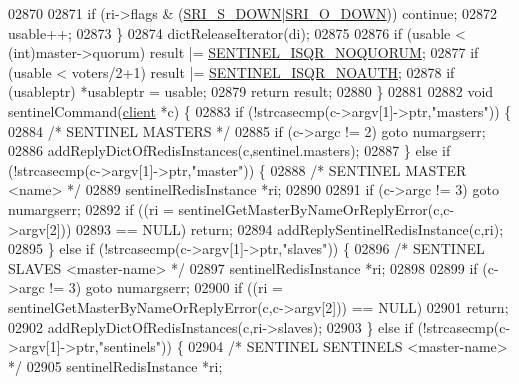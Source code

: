 \begin{DoxyCode}
{{{{{{{{{{{{{{{{{{{{{{{{{{{{{{{{{{{{{{{{{{{{{{{{{{{{{{{{{02870 
02871         \textcolor{keywordflow}{if} (ri->flags & (\hyperlink{sentinel_8c_a8e26596c8bde451c2dd9cecb2c3046d4}{SRI\_S\_DOWN}|\hyperlink{sentinel_8c_a3bbbca05543cd9d9f86d276e2c7c719c}{SRI\_O\_DOWN})) \textcolor{keywordflow}{continue};
02872         usable++;
02873     \}
02874     dictReleaseIterator(di);
02875 
02876     \textcolor{keywordflow}{if} (usable < (\textcolor{keywordtype}{int})master->quorum) result |= \hyperlink{sentinel_8c_a671f4068236e7849f994bb2b67c6ea73}{SENTINEL\_ISQR\_NOQUORUM};
02877     \textcolor{keywordflow}{if} (usable < voters/2+1) result |= \hyperlink{sentinel_8c_aa0ea85d4d4408c055dbc1e46cea1827a}{SENTINEL\_ISQR\_NOAUTH};
02878     \textcolor{keywordflow}{if} (usableptr) *usableptr = usable;
02879     \textcolor{keywordflow}{return} result;
02880 \}
02881 
02882 \textcolor{keywordtype}{void} sentinelCommand(\hyperlink{structclient}{client} *c) \{
02883     \textcolor{keywordflow}{if} (!strcasecmp(c->argv[1]->ptr,\textcolor{stringliteral}{"masters"})) \{
02884         \textcolor{comment}{/* SENTINEL MASTERS */}
02885         \textcolor{keywordflow}{if} (c->argc != 2) \textcolor{keywordflow}{goto} numargserr;
02886         addReplyDictOfRedisInstances(c,sentinel.masters);
02887     \} \textcolor{keywordflow}{else} \textcolor{keywordflow}{if} (!strcasecmp(c->argv[1]->ptr,\textcolor{stringliteral}{"master"})) \{
02888         \textcolor{comment}{/* SENTINEL MASTER <name> */}
02889         sentinelRedisInstance *ri;
02890 
02891         \textcolor{keywordflow}{if} (c->argc != 3) \textcolor{keywordflow}{goto} numargserr;
02892         \textcolor{keywordflow}{if} ((ri = sentinelGetMasterByNameOrReplyError(c,c->argv[2]))
02893             == NULL) \textcolor{keywordflow}{return};
02894         addReplySentinelRedisInstance(c,ri);
02895     \} \textcolor{keywordflow}{else} \textcolor{keywordflow}{if} (!strcasecmp(c->argv[1]->ptr,\textcolor{stringliteral}{"slaves"})) \{
02896         \textcolor{comment}{/* SENTINEL SLAVES <master-name> */}
02897         sentinelRedisInstance *ri;
02898 
02899         \textcolor{keywordflow}{if} (c->argc != 3) \textcolor{keywordflow}{goto} numargserr;
02900         \textcolor{keywordflow}{if} ((ri = sentinelGetMasterByNameOrReplyError(c,c->argv[2])) == NULL)
02901             \textcolor{keywordflow}{return};
02902         addReplyDictOfRedisInstances(c,ri->slaves);
02903     \} \textcolor{keywordflow}{else} \textcolor{keywordflow}{if} (!strcasecmp(c->argv[1]->ptr,\textcolor{stringliteral}{"sentinels"})) \{
02904         \textcolor{comment}{/* SENTINEL SENTINELS <master-name> */}
02905         sentinelRedisInstance *ri;
}}}}}}}}}}}}}}}}}}}}}}}}}}}}}}}}}}}}}}}}}}}}}}}}}}}}}}}}}
\end{DoxyCode}
